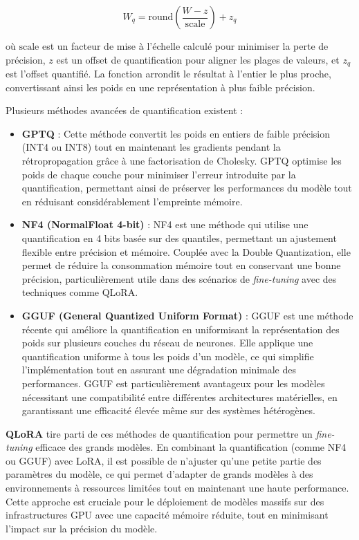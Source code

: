 \documentclass[13pt,a4paper]{article}
\begin{document}
\[
W_q = \text{round}\left(\frac{W - z}{\text{scale}}\right) + z_q
\]

où $\text{scale}$ est un facteur de mise à l'échelle calculé pour minimiser la perte de précision, $z$ est un offset de quantification pour aligner les plages de valeurs, et $z_q$ est l'offset quantifié. La fonction  arrondit le résultat à l'entier le plus proche, convertissant ainsi les poids en une représentation à plus faible précision.

Plusieurs méthodes avancées de quantification existent :
\begin{itemize}
    \item \textbf{GPTQ} : Cette méthode convertit les poids en entiers de faible précision (INT4 ou INT8) tout en maintenant les gradients pendant la rétropropagation grâce à une factorisation de Cholesky. GPTQ optimise les poids de chaque couche pour minimiser l'erreur introduite par la quantification, permettant ainsi de préserver les performances du modèle tout en réduisant considérablement l'empreinte mémoire.
     \item \textbf{NF4 (NormalFloat 4-bit)} : NF4 est une méthode qui utilise une quantification en 4 bits basée sur des quantiles, permettant un ajustement flexible entre précision et mémoire. Couplée avec la Double Quantization, elle permet de réduire la consommation mémoire tout en conservant une bonne précision, particulièrement utile dans des scénarios de \textit{fine-tuning} avec des techniques comme QLoRA.
    \item \textbf{GGUF (General Quantized Uniform Format)} : GGUF est une méthode récente qui améliore la quantification en uniformisant la représentation des poids sur plusieurs couches du réseau de neurones. Elle applique une quantification uniforme à tous les poids d'un modèle, ce qui simplifie l'implémentation tout en assurant une dégradation minimale des performances. GGUF est particulièrement avantageux pour les modèles nécessitant une compatibilité entre différentes architectures matérielles, en garantissant une efficacité élevée même sur des systèmes hétérogènes.
\end{itemize}

\textbf{QLoRA} tire parti de ces méthodes de quantification pour permettre un \textit{fine-tuning} efficace des grands modèles. En combinant la quantification (comme NF4 ou GGUF) avec LoRA, il est possible de n'ajuster qu'une petite partie des paramètres du modèle, ce qui permet d'adapter de grands modèles à des environnements à ressources limitées tout en maintenant une haute performance. Cette approche est cruciale pour le déploiement de modèles massifs sur des infrastructures GPU avec une capacité mémoire réduite, tout en minimisant l'impact sur la précision du modèle.
\end{document}
